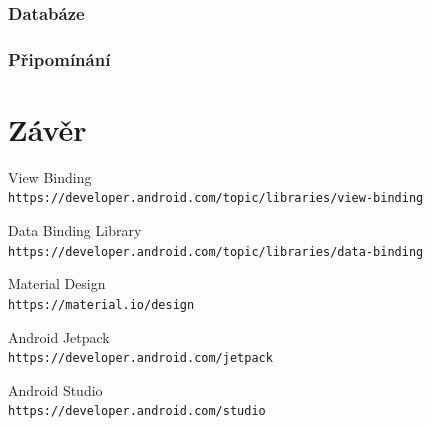 \documentclass[a4paper,12pt]{report}
\begin{document}
\subsection{Databáze}
\subsection{Připomínání}

\chapter*{Závěr}

\renewcommand\bibname{Bibliografie}
\begin{thebibliography}{9}

View Binding
\\\texttt{https://developer.android.com/topic/libraries/view-binding}

Data Binding Library
\\\texttt{https://developer.android.com/topic/libraries/data-binding}

Material Design
\\\texttt{https://material.io/design}

Android Jetpack
\\\texttt{https://developer.android.com/jetpack}

Android Studio
\\\texttt{https://developer.android.com/studio}

\end{thebibliography}
\end{document}
